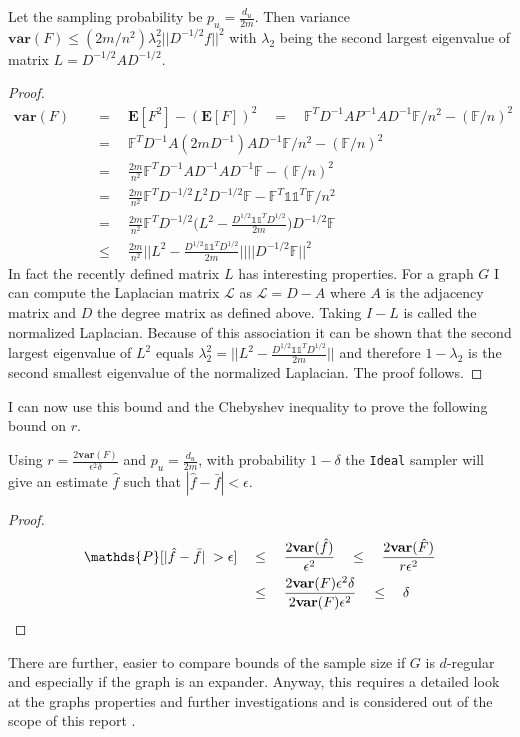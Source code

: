 \begin{lemma}
  Let the sampling probability be $p_u = \frac{d_u}{2m}$. Then variance $\textbf{var}(F) \leq (2m/n^2)\lambda_2^2||D^{-1/2}f||^2$ with $\lambda_2$ being the second largest eigenvalue of matrix $L = D^{-1/2}AD^{-1/2}$. 
\end{lemma}
\begin{proof}
\begin{align*}
\textbf{var}(F) \quad&=\quad \textbf{E}[F^2] - (\textbf{E}[F])^2 \quad=\quad \mathds{F}^TD^{-1}AP^{-1}AD^{-1}\mathds{F}/n^2 - (\mathds{F}/n)^2 \\
&=\quad \mathds{F}^TD^{-1}A(2mD^{-1})AD^{-1}\mathds{F}/n^2 - (\mathds{F}/n)^2\\
&=\quad \frac{2m}{n^2}\mathds{F}^TD^{-1}AD^{-1}AD^{-1}\mathds{F} - (\mathds{F}/n)^2\\
&=\quad \frac{2m}{n^2}\mathds{F}^TD^{-1/2}L^2D^{-1/2}\mathds{F}-\mathds{F}^T\mathds{1}\mathds{1}^T\mathds{F}/n^2\\
&=\quad \frac{2m}{n^2}\mathds{F}^TD^{-1/2}\bigg(L^2-\frac{D^{1/2}\mathds{1}\mathds{1}^TD^{1/2}}{2m}\bigg)D^{-1/2}\mathds{F}\\
&\leq\quad \frac{2m}{n^2}\bigg|\bigg|L^2 - \frac{D^{1/2}\mathds{1}\mathds{1}^TD^{1/2}}{2m}\bigg|\bigg|||D^{-1/2}\mathds{F}||^2
\end{align*}
In fact the recently defined matrix $L$ has interesting properties. For a graph $G$ I can compute the Laplacian matrix $\mathcal{L}$ as $\mathcal{L} = D - A$ where $A$ is the adjacency matrix and $D$ the degree matrix as defined above.
Taking $I-L$ is called the normalized Laplacian. Because of this association it can be shown that the second largest eigenvalue of $L^2$ equals $\lambda_2^2 = ||L^2 - \frac{D^{1/2}\mathds{1}\mathds{1}^TD^{1/2}}{2m}||$ and therefore $1-\lambda_2$ is the second smallest eigenvalue of the normalized Laplacian. The proof follows.
\end{proof}

I can now use this bound and the Chebyshev inequality to prove the following bound on $r$.
\begin{theorem}
Using $r = \frac{2\textbf{var}(F)}{\epsilon^2\delta}$ and $p_u = \frac{d_u}{2m}$, with probability $1-\delta$ the \texttt{Ideal} sampler will give an estimate $\hat{f}$ such that $|\hat{f}-\bar{f}|< \epsilon$.  
\end{theorem}
\begin{proof}
\begin{align*}
\mathds{P}[|\hat{f}-\bar{f}|\;>\epsilon] \quad&\leq\quad \frac{2\textbf{var}(\hat{f})}{\epsilon^2} \quad\leq\quad \frac{2\textbf{var}(\hat{F})}{r\epsilon^2} \\
&\leq\quad \frac{2\textbf{var}(F)\epsilon^2\delta}{2\textbf{var}(F)\epsilon^2} \quad\leq\quad \delta \qedhere
\end{align*}
\end{proof}
There are further, easier to compare bounds of the sample size if $G$ is $d$-regular and especially if the graph is an expander. Anyway, this requires a detailed look at the graphs properties and further investigations and is considered out of the scope of this report \cite{alon1986eigenvalues}.

